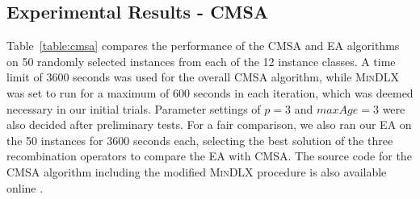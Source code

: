 \documentclass[a4paper,11pt,authoryear]{elsarticle}
\begin{document}
\subsection{Experimental Results - CMSA}
\label{sub:expcmsa}
\noindent Table~\ref{table:cmsa} compares the performance of the CMSA and EA algorithms on 50 randomly selected instances from each of the 12 instance classes. A time limit of 3600 seconds was used for the overall CMSA algorithm, while \textsc{MinDLX} was set to run for a maximum of 600 seconds in each iteration, which was deemed necessary in our initial trials. Parameter settings of $p = 3$ and $maxAge = 3$ were also decided after preliminary tests. For a fair comparison, we also ran our EA on the 50 instances for 3600 seconds each, selecting the best solution of the three recombination operators to compare the EA with CMSA. The source code for the CMSA algorithm including the modified \textsc{MinDLX} procedure is also available online \cite{hawa2019cmsa}.
\end{document}
